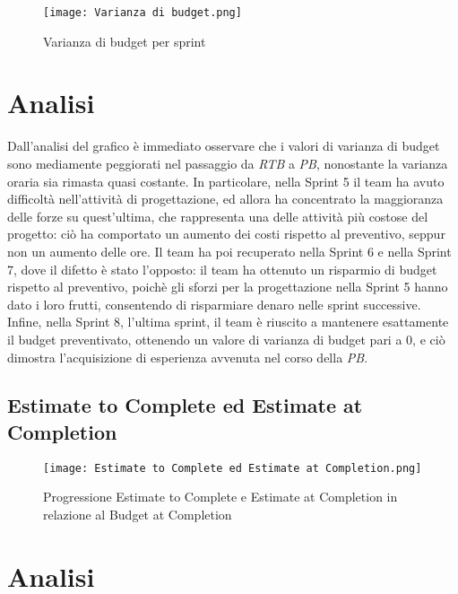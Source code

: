 \begin{figure}[h] 
    \centering
    \texttt{[image: Varianza di budget.png]}
    \caption{Varianza di budget per sprint} 
    \label{fig: Varianza di budget}
\end{figure}

\section*{Analisi}

Dall’analisi del grafico è immediato osservare che i valori di varianza di budget sono mediamente
peggiorati nel passaggio da \emph{RTB} a \emph{PB}, nonostante la varianza oraria sia rimasta quasi costante. In particolare, nella Sprint 5 il team ha avuto difficoltà nell'attività di progettazione, ed allora ha concentrato la maggioranza delle forze su quest'ultima, che rappresenta una delle attività più costose del progetto: ciò ha comportato un aumento dei costi rispetto al preventivo, seppur non un aumento delle ore. Il team ha poi recuperato nella Sprint 6 e nella Sprint 7, dove il difetto è stato l'opposto: il team ha ottenuto un risparmio di budget rispetto al preventivo, poichè gli sforzi per la progettazione nella Sprint 5 hanno dato i loro frutti, consentendo di risparmiare denaro nelle sprint successive. Infine, nella Sprint 8, l'ultima sprint, il team è riuscito a mantenere esattamente il budget preventivato, ottenendo un valore di varianza di budget pari a 0, e ciò dimostra l'acquisizione di esperienza avvenuta nel corso della \emph{PB}.

\newpage

\subsection{Estimate to Complete ed Estimate at Completion}
\label{subsec:Estimate to Complete ed Estimate at Completion}

\begin{figure}[h] 
    \centering
    \texttt{[image: Estimate to Complete ed Estimate at Completion.png]}
    \caption{Progressione Estimate to Complete e Estimate at Completion in relazione al Budget at Completion} 
    \label{fig: Estimate to Complete ed Estimate at Completion}
\end{figure}

\section*{Analisi}

